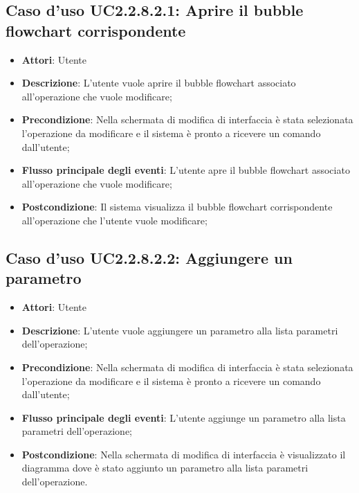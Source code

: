 \documentclass[../AnalisiDeiRequisiti.tex]{subfiles}
\begin{document}
			\subsection{Caso d'uso UC2.2.8.2.1: Aprire il bubble flowchart corrispondente}
			\begin{itemize}
				\item \textbf{Attori}: Utente
				\item \textbf{Descrizione}: L'utente vuole aprire il bubble flowchart associato all'operazione che vuole modificare;
				\item \textbf{Precondizione}: Nella schermata di modifica di interfaccia è stata selezionata l'operazione da modificare e il sistema è pronto a ricevere un comando dall'utente;
				\item \textbf{Flusso principale degli eventi}: L'utente apre il bubble flowchart associato all'operazione che vuole modificare;
				\item \textbf{Postcondizione}: Il sistema visualizza il bubble flowchart corrispondente all'operazione che l'utente vuole modificare;
			\end{itemize}
			\subsection{Caso d'uso UC2.2.8.2.2: Aggiungere un parametro}
			\begin{itemize}
				\item \textbf{Attori}: Utente
				\item \textbf{Descrizione}: L'utente vuole aggiungere un parametro alla lista parametri dell'operazione;
				\item \textbf{Precondizione}: Nella schermata di modifica di interfaccia è stata selezionata l'operazione da modificare e il sistema è pronto a ricevere un comando dall'utente;
				\item \textbf{Flusso principale degli eventi}: L'utente aggiunge un parametro alla lista parametri dell'operazione;
				\item \textbf{Postcondizione}: Nella schermata di modifica di interfaccia è visualizzato il diagramma dove è stato aggiunto un parametro alla lista parametri dell'operazione.
			\end{itemize}
\end{document}
